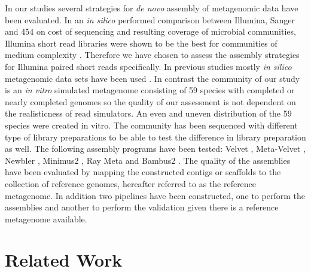 \documentclass[a4paper,12pt]{report}
\begin{document}

In our studies several strategies for {\em de novo} assembly of metagenomic
data have been evaluated. In an {\em in silico} performed comparison between
Illumina, Sanger and 454 on cost of sequencing and resulting coverage of
microbial communities, Illumina short read libraries were shown to be the best
for communities of medium complexity \cite{Mende22384016}. Therefore we have
chosen to assess the assembly strategies for Illumina paired short reads
specifically.  In previous studies mostly {\em in silico} metagenomic data
sets have been used \cite{Pignatelli21625384,Mavromatis17468765}. In contrast
the community of our study is an {\em in vitro} simulated metagenome consisting
of 59 species with completed or nearly completed genomes so the quality of our
assessment is not dependent on the realisticness of read simulators. An even and
uneven distribution of the 59 species were created in vitro. The community has
been sequenced with different type of library preparations to be able to test
the difference in library preparation as well.  The following assembly programs
have been tested: Velvet \cite{Zerbino18349386}, Meta-Velvet \cite{MetaVelvet},
Newbler \cite{Quinn18755037}, Minimus2 \cite{Sommer17324286}, Ray Meta
\cite{Boisvert23259615} and Bambus2 \cite{Koren21926123}. The quality of the
assemblies have been evaluated by mapping the constructed contigs or scaffolds
to the collection of reference genomes, hereafter referred to as the reference
metagenome. In addition two pipelines have been constructed, one to perform the
assemblies and another to perform the validation given there is a reference
metagenome available.


\chapter{Related Work}
\end{document}
